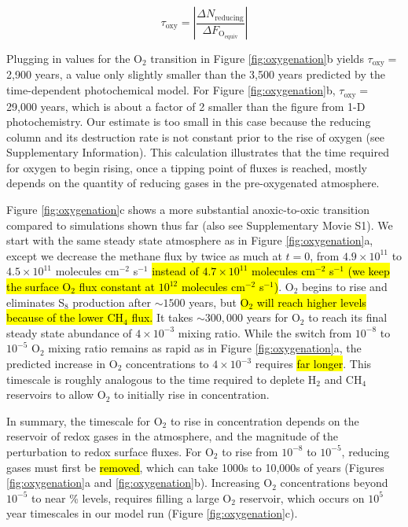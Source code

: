 \documentclass[9pt,twocolumn,twoside,lineno]{pnas-new}
\begin{document}
\begin{equation} \label{eq:tau_oxy}
    \tau_\text{oxy} = \left| \frac{\Delta N_\text{reducing}}{\Delta F_\mathrm{O_{equiv}}} \right|
\end{equation}

Plugging in values for the O$_2$ transition in Figure \ref{fig:oxygenation}b yields $\tau_\text{oxy}=$ 2,900 years, a value only slightly smaller than the 3,500 years predicted by the time-dependent photochemical model. For Figure \ref{fig:oxygenation}b, $\tau_\text{oxy}=$ 29,000 years, which is about a factor of 2 smaller than the figure from 1-D photochemistry. Our estimate is too small in this case because the reducing column and its destruction rate is not constant prior to the rise of oxygen (see Supplementary Information). This calculation illustrates that the time required for oxygen to begin rising, once a tipping point of fluxes is reached, mostly depends on the quantity of reducing gases in the pre-oxygenated atmosphere.

Figure \ref{fig:oxygenation}c shows a more substantial anoxic-to-oxic transition compared to simulations shown thus far (also see Supplementary Movie S1). We start with the same steady state atmosphere as in Figure \ref{fig:oxygenation}a, except we decrease the methane flux by twice as much at $t = 0$, from $4.9 \times 10^{11}$ to $4.5 \times 10^{11}$ molecules cm$^{-2}$ s$^{-1}$ \hl{instead of $4.7 \times 10^{11}$ molecules cm$^{-2}$ s$^{-1}$ (we keep the surface O$_2$ flux constant at $10^{12}$ molecules cm$^{-2}$ s$^{-1}$)}. O$_2$ begins to rise and eliminates S$_8$ production after $\sim1500$ years, but \hl{O$_2$ will reach higher levels because of the lower CH$_4$ flux.} It takes $\sim300,000$ years for O$_2$ to reach its final steady state abundance of $4 \times 10^{-3}$ mixing ratio. While the switch from $10^{-8}$ to $10^{-5}$ O$_2$ mixing ratio remains as rapid as in Figure \ref{fig:oxygenation}a, the predicted increase in O$_2$ concentrations to $4 \times 10^{-3}$ requires \hl{far longer}. This timescale is roughly analogous to the time required to deplete H$_2$ and CH$_4$ reservoirs to allow O$_2$ to initially rise in concentration. 

In summary, the timescale for O$_2$ to rise in concentration depends on the reservoir of redox gases in the atmosphere, and the magnitude of the perturbation to redox surface fluxes. For O$_2$ to rise from $10^{-8}$ to $10^{-5}$, reducing gases must first be \hl{removed}, which can take 1000s to 10,000s of years (Figures \ref{fig:oxygenation}a and \ref{fig:oxygenation}b). Increasing O$_2$ concentrations beyond $10^{-5}$ to near \% levels, requires filling a large O$_2$ reservoir, which occurs on $10^5$ year timescales in our model run (Figure \ref{fig:oxygenation}c).
\end{document}
